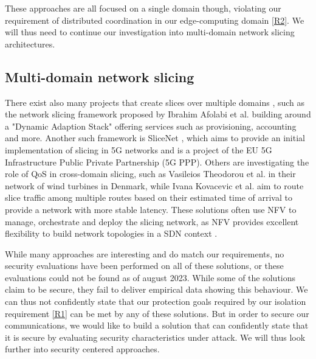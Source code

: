 These approaches are all focused on a single domain though, violating our requirement of distributed coordination in our edge-computing domain \ref{R2}. We will thus need to continue our investigation into multi-domain network slicing architectures.

\subsection{Multi-domain network slicing} There exist also many projects that create slices over multiple domains \cite{MD1,MD2,MD3,MD4,MD5}, such as the network slicing framework proposed by Ibrahim Afolabi et al. \cite{MD1} building around a "Dynamic Adaption Stack" offering services such as provisioning, accounting and more. Another such framework is SliceNet \cite{MD3}, which aims to provide an initial implementation of slicing in 5G networks and is a project of the EU 5G Infrastructure Public Private Partnership (5G PPP). Others are investigating the role of QoS in cross-domain slicing, such as Vasileios Theodorou et al. \cite{MD4} in their network of wind turbines in Denmark, while Ivana Kovacevic et al. \cite{MD5} aim to route slice traffic among multiple routes based on their estimated time of arrival to provide a network with more stable latency. These solutions often use NFV to manage, orchestrate and deploy the slicing network, as NFV provides excellent flexibility to build network topologies in a SDN context \cite{5GSDN1,5GSDN2}.

While many approaches are interesting and do match our requirements, no security evaluations have been performed on all of these solutions, or these evaluations could not be found as of august 2023. While some of the solutions claim to be secure, they fail to deliver empirical data showing this behaviour. We can thus not confidently state that our protection goals required by our isolation requirement \ref{R1} can be met by any of these solutions. But in order to secure our communications, we would like to build a solution that can confidently state that it is secure by evaluating security characteristics under attack. We will thus look further into security centered approaches.

